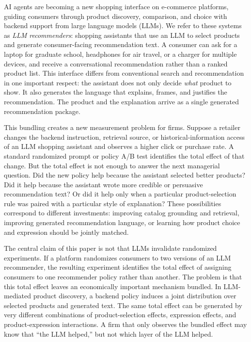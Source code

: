 \documentclass[11pt]{article}
\begin{document}
AI agents are becoming a new shopping interface on e-commerce platforms, guiding consumers through product discovery, comparison, and choice with backend support from large language models (LLMs). We refer to these systems as \textit{LLM recommenders}: shopping assistants that use an LLM to select products and generate consumer-facing recommendation text. A consumer can ask for a laptop for graduate school, headphones for air travel, or a charger for multiple devices, and receive a conversational recommendation rather than a ranked product list. This interface differs from conventional search and recommendation in one important respect: the assistant does not only decide \emph{what} product to show. It also generates the language that explains, frames, and justifies the recommendation. The product and the explanation arrive as a single generated recommendation package.

This bundling creates a new measurement problem for firms. Suppose a retailer changes the backend instruction, retrieval source, or historical-information access of an LLM shopping assistant and observes a higher click or purchase rate. A standard randomized prompt or policy A/B test identifies the total effect of that change. But the total effect is not enough to answer the next managerial question. Did the new policy help because the assistant selected better products? Did it help because the assistant wrote more credible or persuasive recommendation text? Or did it help only when a particular product-selection rule was paired with a particular style of explanation? These possibilities correspond to different investments: improving catalog grounding and retrieval, improving generated recommendation language, or learning how product choice and expression should be jointly matched.

The central claim of this paper is not that LLMs invalidate randomized experiments. If a platform randomizes consumers to two versions of an LLM recommender, the resulting experiment identifies the total effect of assigning consumers to one recommender policy rather than another. The problem is that this total effect leaves an economically important mechanism bundled. In LLM-mediated product discovery, a backend policy induces a joint distribution over selected products and generated text. The same total effect can be generated by very different combinations of product-selection effects, expression effects, and product-expression interactions. A firm that only observes the bundled effect may know that ``the LLM helped,'' but not which layer of the LLM helped.
\end{document}
